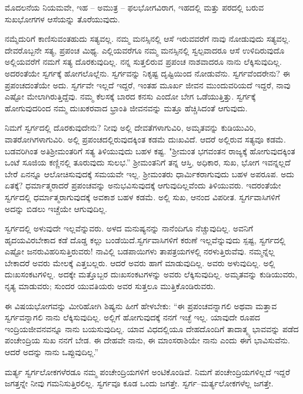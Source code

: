 ಮೊದಲನೆಯ ನಿಯಮವೇ, ಇಹ – ಅಮುತ್ರ – ಫಲಭೋಗವಿರಾಗ, ಇಹದಲ್ಲಿ ಮತ್ತು ಪರದಲ್ಲಿ ಬರುವ ಸುಖಭೋಗಗಳ ಆಸೆಯನ್ನು ತೊರೆಯುವುದು.

ನಮ್ಮೆದುರಿಗೆ ಕಾಣಿಸುವಂತಹುದು ಸತ್ಯವಲ್ಲ. ನಮ್ಮ ಮನಸ್ಸಿನಲ್ಲಿ ಆಸೆ ಇರುವವರೆಗೆ ನಾವು ನೋಡುವುದು ಸತ್ಯವಲ್ಲ. ದೇವರೊಬ್ಬನೇ ಸತ್ಯ, ಪ್ರಪಂಚ ಮಿಥ್ಯ. ಎಲ್ಲಿಯವರೆಗೂ ನಮ್ಮ ಮನಸ್ಸಿನಲ್ಲಿ ಸ್ವಲ್ಪವಾದರೂ ಆಸೆ ಉಳಿದಿರುವುದೊ ಅಲ್ಲಿಯವರೆಗೆ ನಮಗೆ ಸತ್ಯ ದೊರಕುವುದಿಲ್ಲ. ನನ್ನ ಸುತ್ತಲಿರುವ ಪ್ರಪಂಚ ನಾಶವಾದರೂ ನಾನು ಲೆಕ್ಕಿಸುವುದಿಲ್ಲ. ಅದರಂತೆಯೇ ಸ್ವರ್ಗಕ್ಕೆ ಹೋಗಲೊಲ್ಲೆನು. ಸ್ವರ್ಗವನ್ನು ನಿಕೃಷ್ಟ ದೃಷ್ಟಿಯಿಂದ ನೋಡುವೆನು. ಸ್ವರ್ಗವೆಂದರೇನು? ಈ ಪ್ರಪಂಚದಂತೆಯೇ ಅದು. ಸ್ವರ್ಗವೇ ಇಲ್ಲದೆ ಇದ್ದರೆ, ಇಂತಹ ಮೂರ್ಖ ಜೀವನ ಮುಂದುವರಿಯದೆ ಇದ್ದರೆ, ನಾವು ಎಷ್ಟೋ ಮೇಲಾಗಿರುತ್ತಿದ್ದೆವು. ನಮ್ಮ ಕೆಲಸಕ್ಕೆ ಬಾರದ ಕನಸು ಎಂದೋ ಬೇಗ ಒಡೆಯುತ್ತಿತ್ತು. ಸ್ವರ್ಗಕ್ಕೆ ಹೋಗುವುದರಿಂದ ನಮ್ಮ ದುಃಖಕರವಾದ ಭ್ರಾಂತಿ ಜೀವನವನ್ನು ಮತ್ತೂ ಹೆಚ್ಚಿಸಿದಂತೆ ಆಗುವುದು.

ನಿಮಗೆ ಸ್ವರ್ಗದಲ್ಲಿ ದೊರಕುವುದೇನು? ನೀವು ಅಲ್ಲಿ ದೇವತೆಗಳಾಗುವಿರಿ, ಅಮೃತವನ್ನು ಕುಡಿಯುವಿರಿ, ವಾತರೋಗಿಗಳಾಗುವಿರಿ. ಅಲ್ಲಿ ಪ್ರಪಂಚದಲ್ಲಿರುವುದಕ್ಕಿಂತ ಕಡಮೆ ದುಃಖವಿದೆ. ಆದರೆ ಅಲ್ಲಿರುವ ಸತ್ಯವೂ ಕಡಮೆ. ಬಡವರಿಗಿಂತ ಅತಿ\break ಶ‍್ರೀಮಂತರಿಗೆ ಸತ್ಯ ತಿಳಿಯುವುದು ಬಹಳ ಕಷ್ಟ. "ಶ‍್ರೀಮಂತ ಭಗವಂತನ ರಾಜ್ಯಕ್ಕೆ ಹೋಗುವುದಕ್ಕಿಂತ ಒಂಟೆ ಸೂಜಿಯ ಕಣ್ಣಿನಲ್ಲಿ ತೂರುವುದು ಸುಲಭ.'' ಶ‍್ರೀಮಂತನಿಗೆ ತನ್ನ ಆಸ್ತಿ, ಅಧಿಕಾರ, ಸುಖ, ಭೋಗ ಇವನ್ನಲ್ಲದೆ ಬೇರೆ ಏನನ್ನೂ ಆಲೋಚಿಸುವುದಕ್ಕೆ ಸಮಯವೇ ಇಲ್ಲ. ಶ‍್ರೀಮಂತರು ಧಾರ್ಮಿಕರಾಗುವುದು ಬಹಳ ಅಪರೂಪ. ಅದು ಏತಕ್ಕೆ? ಧರ್ಮಾತ್ಮರಾದರೆ ಪ್ರಪಂಚವನ್ನು ಅನುಭವಿಸುವುದಕ್ಕೆ ಆಗುವುದಿಲ್ಲವೆಂದು ತಿಳಿಯುವರು. ಇದರಂತೆಯೇ ಸ್ವರ್ಗದಲ್ಲಿ ಧರ್ಮಾತ್ಮರಾಗುವುದಕ್ಕೆ ಅವಕಾಶ ಬಹಳ ಕಡಮೆ. ಅಲ್ಲಿ ಸುಖ, ಆನಂದ ವಿಪರೀತ. ಸ್ವರ್ಗವಾಸಿಗಳಿಗೆ ಅದನ್ನು ಬಿಡಲು ಇಚ್ಚೆಯೇ ಆಗುವುದಿಲ್ಲ.

ಸ್ವರ್ಗದಲ್ಲಿ ಅಳುವುದೇ ಇಲ್ಲವೆನ್ನುವರು. ಅಳದ ಮನುಷ್ಯನನ್ನು ನಾನೆಂದಿಗೂ ನೆಚ್ಚುವುದಿಲ್ಲ. ಅವನಿಗೆ ಹೃದಯವಿರಬೇಕಾದ ಕಡೆ ದೊಡ್ಡ ಕಲ್ಲು ಬಂಡೆಯಿದೆ.\break ಸ್ವರ್ಗವಾಸಿಗಳಿಗೆ ಕರುಣೆ ಇಲ್ಲವೆನ್ನುವುದು ಸ್ಪಷ್ಟ, ಸ್ವರ್ಗದಲ್ಲಿ ಎಷ್ಟೋ ಜನರು\break ವಿಹರಿಸುತ್ತಿರುವರು! ನಾವಿಲ್ಲಿ ಬಡಪಾಯಿಗಳು ತಾಪತ್ರಯಗಳಲ್ಲಿ ನರಳುತ್ತಿರುವೆವು. ನಮ್ಮನ್ನೆಲ್ಲ ಬೇಕಾದರೆ ಅವರು ಮೇಲಕ್ಕೆ ಎತ್ತಬಲ್ಲರು. ಆದರೆ ಅವರು ಹಾಗೆ ಮಾಡುವುದಿಲ್ಲ. ಅವರು ಅಳುವುದಿಲ್ಲ. ಅಲ್ಲಿ ದುಃಖಸಂಕಟಗಳಿಲ್ಲ. ಅದಕ್ಕೇ ಮತ್ತೊಬ್ಬರ ದುಃಖಸಂಕಟಗಳನ್ನು ಅವರು ಲೆಕ್ಕಿಸುವುದಿಲ್ಲ. ಅಮೃತವನ್ನು ಕುಡಿಯುವರು, ನೃತ್ಯ ಮಾಡುವರು; ಸುಂದರ ಯುವತಿಯರು ಅವರ ಸುತ್ತಲೂ ಮುತ್ತಿಕೊಂಡಿರುವರು.

ಈ ವಿಷಯಭೋಗವನ್ನು ಮೀರಿಹೋಗಿ ಶಿಷ್ಯನು ಹೀಗೆ ಹೇಳಬೇಕು: “ಈ ಪ್ರಪಂಚವನ್ನಾಗಲಿ ಅಥವಾ ಮತ್ತಾವ ಸ್ವರ್ಗವನ್ನಾಗಲಿ ನಾನು ಲೆಕ್ಕಿಸುವುದಿಲ್ಲ. ಅಲ್ಲಿಗೆ ಹೋಗುವುದಕ್ಕೆ ನನಗೆ ಇಚ್ಛೆ ಇಲ್ಲ. ಯಾವುದೇ ರೂಪದ ಇಂದ್ರಿಯಜೀವನವನ್ನೂ ನಾನು ಬಯಸುವುದಿಲ್ಲ. ಯಾವ ವಿಧದಲ್ಲಿಯೂ ದೇಹದೊಂದಿಗೆ ತಾದಾತ್ಮ್ಯ ಭಾವವನ್ನು ಪಡೆದ ಪಂಚೇಂದ್ರಿಯ ಸುಖ ನನಗೆ ಬೇಡ. ಈ ದೇಹವೇ ನಾನು, ಈ ಮಾಂಸರಾಶಿಯೇ ನಾನು ಎಂದು ಈಗ ಭಾವಿಸುವೆನು. ಆದರೆ ಅದನ್ನು ನಾನು ಒಪ್ಪುವುದಿಲ್ಲ.”

ಮರ್ತ್ಯ ಸ್ವರ್ಗಲೋಕಗಳೆರಡೂ ನಮ್ಮ ಪಂಚೇಂದ್ರಿಯಗಳಿಗೆ ಅಂಟಿಕೊಂಡಿವೆ. ನಿಮಗೆ ಪಂಚೇಂದ್ರಿಯಗಳಿಲ್ಲದೆ ಇದ್ದರೆ ಜಗತ್ತನ್ನೇ ನೀವು ಗಮನಿಸುತ್ತಿರಲಿಲ್ಲ. ಸ್ವರ್ಗವೂ ಕೂಡ ಒಂದು ಜಗತ್ತೇ. ಸ್ವರ್ಗ–ಮರ್ತ್ಯಲೋಕಗಳೆಲ್ಲ ಜಗತ್ತೇ.


